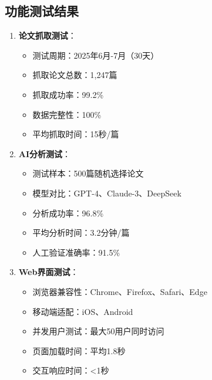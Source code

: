 \documentclass[12pt,a4paper]{article}
\begin{document}
\subsection{功能测试结果}
\begin{enumerate}
    \item \textbf{论文抓取测试}：
        \begin{itemize}
            \item 测试周期：2025年6月-7月（30天）
            \item 抓取论文总数：1,247篇
            \item 抓取成功率：99.2\%
            \item 数据完整性：100\%
            \item 平均抓取时间：15秒/篇
        \end{itemize}
    
    \item \textbf{AI分析测试}：
        \begin{itemize}
            \item 测试样本：500篇随机选择论文
            \item 模型对比：GPT-4、Claude-3、DeepSeek
            \item 分析成功率：96.8\%
            \item 平均分析时间：3.2分钟/篇
            \item 人工验证准确率：91.5\%
        \end{itemize}
    
    \item \textbf{Web界面测试}：
        \begin{itemize}
            \item 浏览器兼容性：Chrome、Firefox、Safari、Edge
            \item 移动端适配：iOS、Android
            \item 并发用户测试：最大50用户同时访问
            \item 页面加载时间：平均1.8秒
            \item 交互响应时间：<1秒
        \end{itemize}
\end{enumerate}
\end{document}
